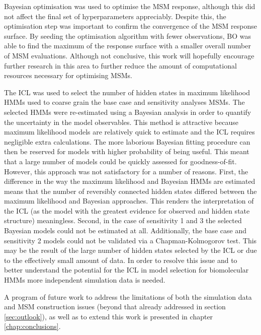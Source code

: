 Bayesian optimisation was used to optimise the MSM response, although this did not affect the final set of hyperparameters appreciably. Despite this, the optimisation step was important to confirm the convergence of the MSM response surface. By seeding the optimisation algorithm with fewer observations, BO was able to find the maximum of the response surface with a smaller overall number of MSM evaluations. Although not conclusive, this work will hopefully encourage further research in this area to further reduce the amount of computational resources necessary for optimising MSMs. 

The ICL was used to select the number of hidden states in maximum likelihood HMMs used to coarse grain the base case and sensitivity analyses MSMs. The selected HMMs were re-estimated using a Bayesian analysis in order to quantify the uncertainty in the model observables. This method is attractive because maximum likelihood models are relatively quick to estimate and the ICL requires negligible extra calculations. The more laborious Bayesian fitting procedure can then be reserved for models with higher probability of being useful. This meant that a large number of models could be quickly assessed for goodness-of-fit. However, this approach was not satisfactory for a number of reasons. First, the difference in the way the maximum likelihood and Bayesian HMMs are estimated means that the number of reversibly connected hidden states differed between the maximum likelihood and Bayesian approaches. This renders the interpretation of the ICL (as the model with the greatest evidence for observed and hidden state structure) meaningless. Second, in the case of sensitivity 1 and 3 the selected Bayesian models could not be estimated at all. Additionally, the base case and sensitivity 2 models could not be validated via a Chapman-Kolmogorov test. This may be the result of the large number of hidden states selected by the ICL or due to the effectively small amount of data. In order to resolve this issue and to better understand the potential for the ICL in model selection for biomolecular HMMs more independent simulation data is needed. 

A program of future work to address the limitations of both the simulation data and MSM construction issues (beyond that already addressed in section \ref{sec:outlook}), as well as to extend this work is presented in chapter \ref{chap:conclusions}.  









